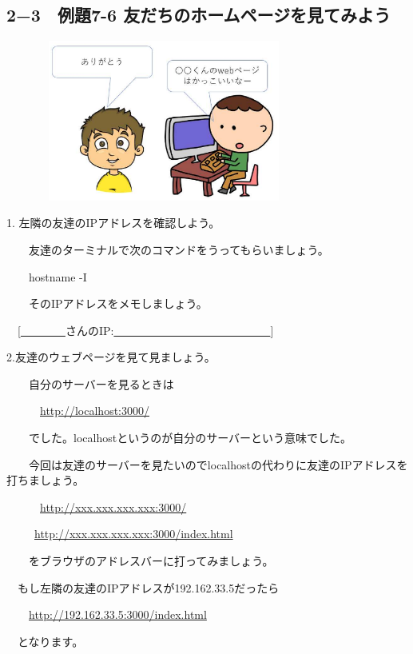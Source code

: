 \documentclass[a4paper,12pt,dvipdfmx]{jarticle}
\begin{document}
\bigskip


\bigskip


\bigskip

\clearpage\subsection*{2−3　例題7-6
友だちのホームページを見てみよう}


\centering
\includegraphics[width=10.423cm,height=5.279cm]{ome7-img042}
\flushleft


\bigskip



1.
左隣の友達のIPアドレスを確認しよう。

　\ \ 友達のターミナルで次のコマンドをうってもらいましょう。

　\ \ hostname -I

　\ \ そのIPアドレスをメモしましょう。

\ \ [\underline{　　　　}さんのIP:\underline{　　　　　　　　　　　　　　}]


\bigskip

2.友達のウェブページを見て見ましょう。

　\ \ 自分のサーバーを見るときは

　\ \ 　\url{http://localhost:3000/}

　\ \ でした。localhostというのが自分のサーバーという意味でした。

　\ \ 今回は友達のサーバーを見たいのでlocalhostの代わりに友達のIPアドレスを打ちましょう。

　\ \ 　\url{http://xxx.xxx.xxx.xxx:3000/}

\ \ \ 　\url{http://xxx.xxx.xxx.xxx:3000/index.html}

　\ \ をブラウザのアドレスバーに打ってみましょう。

\ \ もし左隣の友達のIPアドレスが192.162.33.5だったら

\ \ 　\url{http://192.162.33.5:3000/index.html}

\ \ となります。
\end{document}
